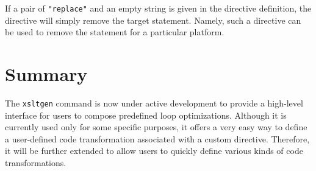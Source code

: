 If a pair of \texttt{"replace"} and an empty string is given in the
directive definition, the directive will simply remove the target
statement. Namely, such a directive can be used to remove the statement
for a particular platform.


\section{Summary}
The \texttt{xsltgen} command is now under active development to provide
a high-level interface for users to compose predefined loop
optimizations.  Although it is currently used only for some specific
purposes, it offers a very easy way to define a user-defined code
transformation associated with a custom directive. Therefore, it will be
further extended to allow users to quickly define various kinds of code
transformations.

